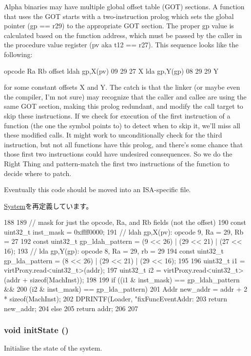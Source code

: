 Alpha binaries may have multiple global offset table (GOT) sections. A function that uses the GOT starts with a two-\/instruction prolog which sets the global pointer (gp == r29) to the appropriate GOT section. The proper gp value is calculated based on the function address, which must be passed by the caller in the procedure value register (pv aka t12 == r27). This sequence looks like the following:

opcode Ra Rb offset ldah gp,X(pv) 09 29 27 X lda gp,Y(gp) 08 29 29 Y

for some constant offsets X and Y. The catch is that the linker (or maybe even the compiler, I'm not sure) may recognize that the caller and callee are using the same GOT section, making this prolog redundant, and modify the call target to skip these instructions. If we check for execution of the first instruction of a function (the one the symbol points to) to detect when to skip it, we'll miss all these modified calls. It might work to unconditionally check for the third instruction, but not all functions have this prolog, and there's some chance that those first two instructions could have undesired consequences. So we do the Right Thing and pattern-\/match the first two instructions of the function to decide where to patch.

Eventually this code should be moved into an ISA-\/specific file. 

\hyperlink{classSystem_aff94f650c5eef23b8dc350ea755bdef4}{System}を再定義しています。


\begin{DoxyCode}
188 {
189     // mask for just the opcode, Ra, and Rb fields (not the offset)
190     const uint32_t inst_mask = 0xffff0000;
191     // ldah gp,X(pv): opcode 9, Ra = 29, Rb = 27
192     const uint32_t gp_ldah_pattern = (9 << 26) | (29 << 21) | (27 << 16);
193     // lda  gp,Y(gp): opcode 8, Ra = 29, rb = 29
194     const uint32_t gp_lda_pattern  = (8 << 26) | (29 << 21) | (29 << 16);
195 
196     uint32_t i1 = virtProxy.read<uint32_t>(addr);
197     uint32_t i2 = virtProxy.read<uint32_t>(addr + sizeof(MachInst));
198 
199     if ((i1 & inst_mask) == gp_ldah_pattern &&
200         (i2 & inst_mask) == gp_lda_pattern) {
201         Addr new_addr = addr + 2 * sizeof(MachInst);
202         DPRINTF(Loader, "fixFuncEventAddr: %
203         return new_addr;
204     } else {
205         return addr;
206     }
207 }
\end{DoxyCode}
\hypertarget{classAlphaSystem_a3c34ea9b29f410748d4435a667484924}{
\subsubsection[{initState}]{\setlength{\rightskip}{0pt plus 5cm}void initState ()}}
\label{classAlphaSystem_a3c34ea9b29f410748d4435a667484924}
Initialise the state of the system. 

